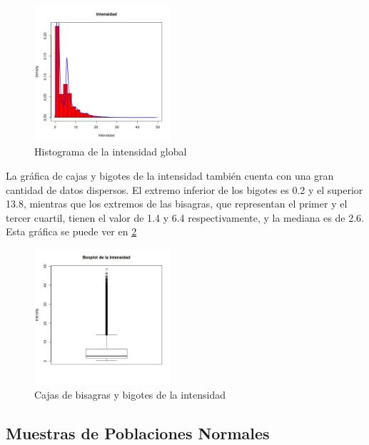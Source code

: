\documentclass[a4paper,10pt,twocolumn]{report}
\begin{document}
	\begin{figure}[H]
		\centering
		\includegraphics[width=0.45\textwidth]{img/ex1/Histograms/Histograms_Intensity} 
		\caption{Histograma de la intensidad global}
		\label{hist:1.3}
	\end{figure}
	
	La gráfica de cajas y bigotes de la intensidad también cuenta con una gran cantidad de datos dispersos. El extremo inferior de los bigotes es 0.2 y el superior 13.8, mientras que los extremos de las bisagras, que representan el primer y el tercer cuartil, tienen el valor de 1.4 y 6.4 respectivamente, y la mediana es de 2.6. Esta gráfica se puede ver en \ref{box:1.3}
	
	\begin{figure}[H]
	 	\centering
	    \includegraphics[width=0.45\textwidth]{img/ex1/BoxPlots/BoxPlots_Intensity.jpeg} 
	 	\caption{Cajas de bisagras y bigotes de la intensidad}
	 	\label{box:1.3}
	\end{figure}
	
	\subsection{Muestras de Poblaciones Normales}\label{sub:ex2}
\end{document}
